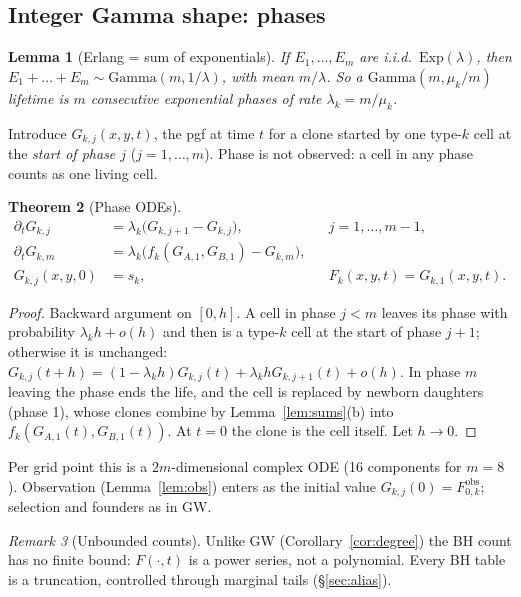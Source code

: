 \documentclass[11pt]{article}
\newtheorem{theorem}{Theorem}[section]
\newtheorem{lemma}[theorem]{Lemma}
\theoremstyle{definition}
\theoremstyle{remark}
\newtheorem{remark}[theorem]{Remark}
\begin{document}
\subsection{Integer Gamma shape: phases}
\begin{lemma}[Erlang = sum of exponentials]\label{lem:erlang}
If $E_1,\dots,E_m$ are i.i.d.\ $\mathrm{Exp}(\lambda)$, then $E_1+\dots+E_m\sim\mathrm{Gamma}(m,1/\lambda)$, with mean $m/\lambda$. So a $\mathrm{Gamma}(m,\mu_k/m)$ lifetime is $m$ consecutive exponential \emph{phases} of rate $\lambda_k=m/\mu_k$.
\end{lemma}
Introduce $G_{k,j}(x,y,t)$, the pgf at time $t$ for a clone started by one type-$k$ cell at the \emph{start of phase $j$} ($j=1,\dots,m$). Phase is not observed: a cell in any phase counts as one living cell.
\begin{theorem}[Phase ODEs]\label{thm:phase}
\begin{align*}
\partial_tG_{k,j}&=\lambda_k\big(G_{k,j+1}-G_{k,j}\big),&& j=1,\dots,m-1,\\
\partial_tG_{k,m}&=\lambda_k\big(f_k(G_{A,1},G_{B,1})-G_{k,m}\big),\\
G_{k,j}(x,y,0)&=s_k,&& F_k(x,y,t)=G_{k,1}(x,y,t).
\end{align*}
\end{theorem}
\begin{proof}
Backward argument on $[0,h]$. A cell in phase $j<m$ leaves its phase with probability $\lambda_kh+o(h)$ and then is a type-$k$ cell at the start of phase $j+1$; otherwise it is unchanged: $G_{k,j}(t+h)=(1-\lambda_kh)G_{k,j}(t)+\lambda_khG_{k,j+1}(t)+o(h)$. In phase $m$ leaving the phase ends the life, and the cell is replaced by newborn daughters (phase 1), whose clones combine by Lemma~\ref{lem:sums}(b) into $f_k(G_{A,1}(t),G_{B,1}(t))$. At $t=0$ the clone is the cell itself. Let $h\to0$.
\end{proof}
Per grid point this is a $2m$-dimensional complex ODE (16 components for $m=8$). Observation (Lemma~\ref{lem:obs}) enters as the initial value $G_{k,j}(0)=F^{\mathrm{obs}}_{0,k}$; selection and founders as in GW.

\begin{remark}[Unbounded counts]
Unlike GW (Corollary~\ref{cor:degree}) the BH count has no finite bound: $F(\cdot,t)$ is a power series, not a polynomial. Every BH table is a truncation, controlled through marginal tails (\S\ref{sec:alias}).
\end{remark}
\end{document}
